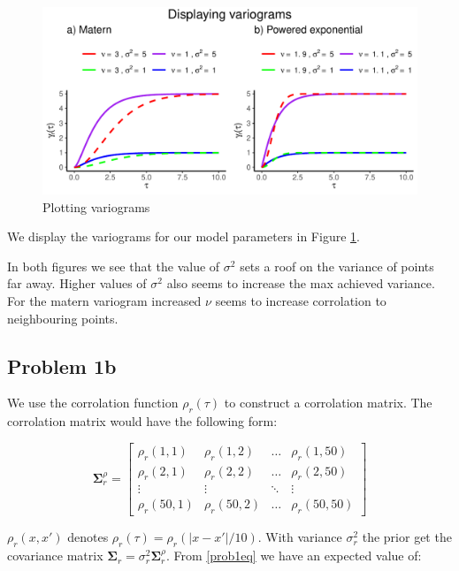 \documentclass[]{article}
\newcommand{\matr}[1]{\ensuremath{\boldsymbol{\mathbf{#1}}}}
\begin{document}
\begin{figure}
\centering
\includegraphics{Exercise_1_files/figure-latex/fig1a2-1.pdf}
\caption{\label{fig:fig1a2} Plotting variograms}
\end{figure}

We display the variograms for our model parameters in Figure
\ref{fig:fig1a2}.

In both figures we see that the value of \(\sigma^2\) sets a roof on the
variance of points far away. Higher values of \(\sigma^2\) also seems to
increase the max achieved variance. For the matern variogram increased
\(\nu\) seems to increase corrolation to neighbouring points.

\newpage

\subsection{Problem 1b}\label{problem-1b}

We use the corrolation function \(\rho_r(\tau)\) to construct a
corrolation matrix. The corrolation matrix would have the following
form:

\begin{equation}
    \matr \Sigma_r^\rho = 
    \begin{bmatrix}
        \rho_r(1, 1) & \rho_r(1, 2) & \dots & \rho_r(1, 50) \\
        \rho_r(2, 1) & \rho_r(2, 2) & \dots & \rho_r(2, 50) \\
        \vdots & \vdots & \ddots & \vdots \\
        \rho_r(50, 1) & \rho_r(50, 2) & \dots & \rho_r(50, 50)
    \end{bmatrix}
\end{equation}

\(\rho_r(x, x')\) denotes \(\rho_r(\tau) = \rho_r(|x-x'|/10)\). With
variance \(\sigma_r^2\) the prior get the covariance matrix
\(\matr \Sigma_r = \sigma_r^2 \matr \Sigma_r^\rho\). From
\eqref{prob1eq} we have an expected value of:
\end{document}
